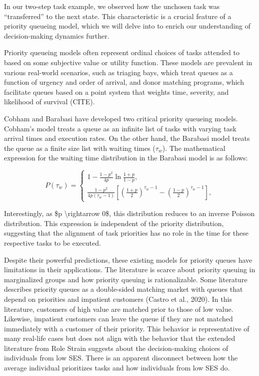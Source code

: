 \documentclass[
]{article}
\begin{document}
In our two-step task example, we observed how the unchosen task was
``transferred'' to the next state. This characteristic is a crucial
feature of a priority queueing model, which we will delve into to enrich
our understanding of decision-making dynamics further.

Priority queueing models often represent ordinal choices of tasks
attended to based on some subjective value or utility function. These
models are prevalent in various real-world scenarios, such as triaging
bays, which treat queues as a function of urgency and order of arrival,
and donor matching programs, which facilitate queues based on a point
system that weights time, severity, and likelihood of survival (CITE).

Cobham and Barabasi have developed two critical priority queueing
models. Cobham's model treats a queue as an infinite list of tasks with
varying task arrival times and execution rates. On the other hand, the
Barabasi model treats the queue as a finite size list with waiting times
(\(\tau_w\)). The mathematical expression for the waiting time
distribution in the Barabasi model is as follows:

\[
P(\tau_w) = \left\{
            \begin{array}{ll}
            1 - \frac{1-p^2}{4p}\ln\frac{1+p}{1-p},\\
            \frac{1-p^2}{4p(\tau_w - 1)}[(\frac{1+p}{2})^{\tau_w-1} - (\frac{1-p}{2})^{\tau_w - 1}],
            \end{array}
            \right.
\]

Interestingly, as \$p \textbackslash rightarrow 0\$, this distribution
reduces to an inverse Poisson distribution. This expression is
independent of the priority distribution, suggesting that the alignment
of task priorities has no role in the time for these respective tasks to
be executed.

Despite their powerful predictions, these existing models for priority
queues have limitations in their applications. The literature is scarce
about priority queuing in marginalized groups and how priority queuing
is rationalizable. Some literature describes priority queues as a
double-sided matching market with queues that depend on priorities and
impatient customers (Castro et al., 2020). In this literature, customers
of high value are matched prior to those of low value. Likewise,
impatient customers can leave the queue if they are not matched
immediately with a customer of their priority. This behavior is
representative of many real-life cases but does not align with the
behavior that the extended literature from Role Strain suggests about
the decision-making choices of individuals from low SES. There is an
apparent disconnect between how the average individual prioritizes tasks
and how individuals from low SES do.
\end{document}
